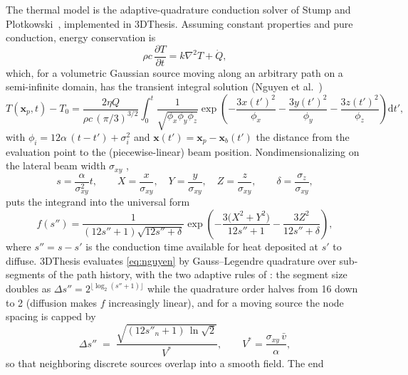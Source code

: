 \documentclass[11pt]{article}
\newcommand{\dd}{\mathrm{d}}
\begin{document}
The thermal model is the adaptive-quadrature conduction solver of Stump and
Plotkowski~\cite{stump2019}, implemented in 3DThesis. Assuming constant
properties and pure conduction, energy conservation is
\begin{equation}
  \rho c\,\frac{\partial T}{\partial t} = k \nabla^2 T + \dot Q ,
  \label{eq:heat}
\end{equation}
which, for a volumetric Gaussian source moving along an arbitrary path on a
semi-infinite domain, has the transient integral solution (Nguyen et
al.~\cite{nguyen1999})
\begin{equation}
  T(\mathbf{x}_p, t) - T_0
  = \frac{2\eta Q}{\rho c\,(\pi/3)^{3/2}}
    \int_0^{t} \frac{1}{\sqrt{\phi_x \phi_y \phi_z}}
    \exp\!\left(
      -\frac{3x(t')^2}{\phi_x}
      -\frac{3y(t')^2}{\phi_y}
      -\frac{3z(t')^2}{\phi_z}
    \right) \dd t',
  \label{eq:nguyen}
\end{equation}
with $\phi_i = 12\alpha\,(t-t') + \sigma_i^2$ and
$\mathbf{x}(t') = \mathbf{x}_p - \mathbf{x}_b(t')$ the distance from the
evaluation point to the (piecewise-linear) beam position. Nondimensionalizing
on the lateral beam width $\sigma_{xy}$
\cite{stump2019},
\begin{equation}
  s=\frac{\alpha}{\sigma_{xy}^2}t,\qquad
  X=\frac{x}{\sigma_{xy}},\quad Y=\frac{y}{\sigma_{xy}},\quad Z=\frac{z}{\sigma_{xy}},\qquad
  \delta=\frac{\sigma_z}{\sigma_{xy}},
\end{equation}
puts the integrand into the universal form
\begin{equation}
  f(s'') = \frac{1}{(12 s''+1)\sqrt{12 s''+\delta}}
  \exp\!\left(-\frac{3\bigl(X^2+Y^2\bigr)}{12 s''+1}-\frac{3Z^2}{12 s''+\delta}\right),
  \label{eq:nondim}
\end{equation}
where $s''=s-s'$ is the conduction time available for heat deposited at $s'$
to diffuse. 3DThesis evaluates \eqref{eq:nguyen} by Gauss--Legendre
quadrature over sub-segments of the path history, with the two adaptive rules
of \cite{stump2019}: the segment size doubles as
$\Delta s'' = 2^{\lfloor \log_2 (s''+1)\rfloor}$ while the quadrature order
halves from 16 down to 2 (diffusion makes $f$ increasingly linear), and for a
moving source the node spacing is capped by
\begin{equation}
  \Delta s'' \;=\; \frac{\sqrt{(12 s''_n + 1)\,\ln\sqrt{2}}}{V^{*}},
  \qquad V^{*} = \frac{\sigma_{xy}\,\bar v}{\alpha},
  \label{eq:velocity-spacing}
\end{equation}
so that neighboring discrete sources overlap into a smooth field. The end
\end{document}
